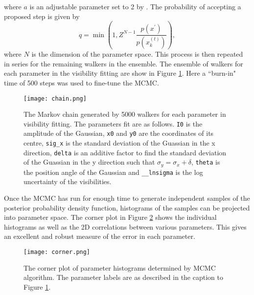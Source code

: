 where $a$ is an adjustable parameter set to 2 by \cite{Goodman2010}. The probability of accepting a proposed step is given by
\begin{equation}
\label{eq:MCMC_stretch_newstate}
q = \min \left(1, Z^{N-1} \frac{p(x^\prime)}{p(x_k^{(t)})}\right),
\end{equation} 
where $N$ is the dimension of the parameter space. This process is then repeated in series for the remaining walkers in the ensemble.
The ensemble of walkers for each parameter in the visibility fitting are show in Figure \ref{fig:MCMCchain}. Here a ``burn-in" time of 500 steps was used to fine-tune the MCMC. 
\begin{figure}[ht]
\centering
\texttt{[image: chain.png]}
\caption[The Markov chain generated by 5000 walkers for each parameter in visibility fitting.]{The Markov chain generated by 5000 walkers for each parameter in visibility fitting. The parameters fit are as follows. \texttt{I0} is the amplitude of the Gaussian, \texttt{x0} and \texttt{y0} are the coordinates of its centre, \texttt{sig\_x} is the standard deviation of the Guassian in the x direction, \texttt{delta} is an additive factor to find the standard deviation of the Guassian in the y direction such that $\sigma_y = \sigma_x + \delta$, \texttt{theta} is the position angle of the Gaussian and \texttt{\_\_lnsigma} is the log uncertainty of the visibilities. }
\label{fig:MCMCchain}
\end{figure}

Once the MCMC has run for enough time to generate independent samples of the posterior probability density function, histograms of the samples can be projected into parameter space. The corner plot in Figure \ref{fig:MCMCcorner} shows the individual histograms as well as the 2D correlations between various parameters. This gives an excellent and robust measure of the error in each parameter.

\begin{figure}[ht]
\centering
\texttt{[image: corner.png]}
\caption[A Corner plot of parameter histograms determined by MCMC algorithm.]{The corner plot of parameter histograms determined by MCMC algorithm. The parameter labels are as described in the caption to Figure \ref{fig:MCMCchain}.}
\label{fig:MCMCcorner}
\end{figure}


